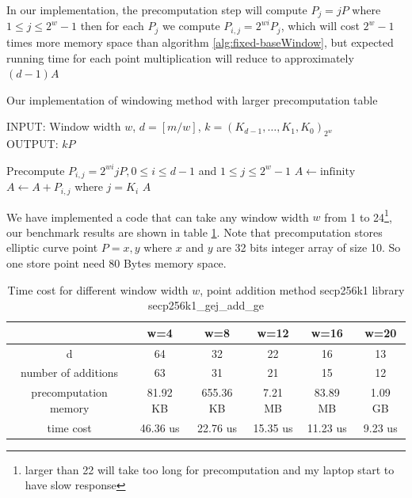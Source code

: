 In our implementation, the precomputation step will compute $P_j=jP$ where $ 1 \leq j \leq 2^w-1$ then for each $P_j$ we compute $P_{i,j}=2^{wi}P_j$, which will cost $2^w-1$ times more memory space than algorithm \ref{alg:fixed-baseWindow}, but expected running time for each point multiplication will reduce to approximately $(d-1)A$

\begin{algorithm}[H] 
	\caption{Our implementation of windowing method with larger precomputation table}
	\label{alg:newWindow}
	INPUT: Window width $w$, $d = [m/w]$, $k=(K_{d-1},\dots,K_1,K_0)_{2^w}$\\
	OUTPUT: $kP$
	\begin{algorithmic} [1]
		\STATE Precompute $P_{i,j} = 2^{wi}jP, 0 \leq i \leq d-1$ and $ 1 \leq j \leq 2^w-1$
		\STATE $A \leftarrow \text{infinity}$
		\STATE $A \leftarrow A+P_{i,j}$ where $j = K_i$
		\ENDFOR
		\RETURN $A$
	\end{algorithmic}
\end{algorithm}

We have implemented a code that can take any window width $w$ from 1 to 24\footnote{larger than 22 will take too long for precomputation and my laptop start to have slow response}, our benchmark results are shown in table \ref{tb:benchmarkWindowSize1}. Note that precomputation stores elliptic curve point $P = {x,y}$ where $x$ and $y$ are 32 bits integer array of size 10. So one store point need 80 Bytes memory space. 

\begin{table}[h]
	\centering
	\caption{Time cost for different window width $w$, point addition method secp256k1 library \cite{Wulliesecp256k1} secp256k1\_gej\_add\_ge }
	\label{tb:benchmarkWindowSize1}
	\begin{tabular}{|c|c|c|c|c|c|}
		\hline
		& w=4 & w=8 & w=12 & w=16 & w=20 \\ \hline
		d         & 64  & 32  &  22  & 16   &   13   \\ \hline
		number of additions & 63 & 31 & 21 & 15 & 12 \\ \hline
		precomputation memory & 81.92 KB & 655.36 KB & 7.21 MB & 83.89 MB & 1.09 GB \\ \hline 
		time cost &  46.36 us & 22.76 us  &  15.35 us & 11.23 us &  9.23 us \\ \hline
	\end{tabular}
\end{table}
